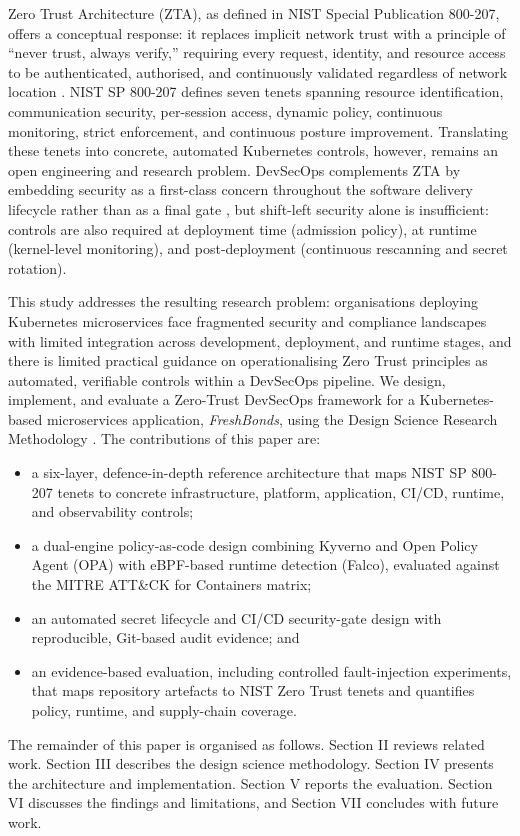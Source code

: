 \documentclass[conference]{IEEEtran}
\begin{document}
Zero Trust Architecture (ZTA), as defined in NIST Special Publication 800-207, offers a conceptual response: it replaces implicit network trust with a principle of ``never trust, always verify,'' requiring every request, identity, and resource access to be authenticated, authorised, and continuously validated regardless of network location \cite{rose2020}. NIST SP 800-207 defines seven tenets spanning resource identification, communication security, per-session access, dynamic policy, continuous monitoring, strict enforcement, and continuous posture improvement. Translating these tenets into concrete, automated Kubernetes controls, however, remains an open engineering and research problem. DevSecOps complements ZTA by embedding security as a first-class concern throughout the software delivery lifecycle rather than as a final gate \cite{myrbakken2017}, but shift-left security alone is insufficient: controls are also required at deployment time (admission policy), at runtime (kernel-level monitoring), and post-deployment (continuous rescanning and secret rotation).

This study addresses the resulting research problem: organisations deploying Kubernetes microservices face fragmented security and compliance landscapes with limited integration across development, deployment, and runtime stages, and there is limited practical guidance on operationalising Zero Trust principles as automated, verifiable controls within a DevSecOps pipeline. We design, implement, and evaluate a Zero-Trust DevSecOps framework for a Kubernetes-based microservices application, \emph{FreshBonds}, using the Design Science Research Methodology \cite{hevner2004,peffers2007}. The contributions of this paper are:
\begin{itemize}
\item a six-layer, defence-in-depth reference architecture that maps NIST SP 800-207 tenets to concrete infrastructure, platform, application, CI/CD, runtime, and observability controls;
\item a dual-engine policy-as-code design combining Kyverno and Open Policy Agent (OPA) with eBPF-based runtime detection (Falco), evaluated against the MITRE ATT\&CK for Containers matrix;
\item an automated secret lifecycle and CI/CD security-gate design with reproducible, Git-based audit evidence; and
\item an evidence-based evaluation, including controlled fault-injection experiments, that maps repository artefacts to NIST Zero Trust tenets and quantifies policy, runtime, and supply-chain coverage.
\end{itemize}
The remainder of this paper is organised as follows. Section II reviews related work. Section III describes the design science methodology. Section IV presents the architecture and implementation. Section V reports the evaluation. Section VI discusses the findings and limitations, and Section VII concludes with future work.
\end{document}
